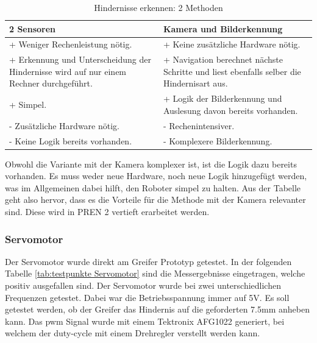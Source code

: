\begin{table}[H]
\centering
\small
\begin{tabularx}{\textwidth}{|X|X|}
        \hline
        \textbf{2 Sensoren} & \textbf{Kamera und Bilderkennung}\\
        \hline
        + Weniger Rechenleistung nötig. & + Keine zusätzliche Hardware nötig.  \\ \hline
        + Erkennung und Unterscheidung der Hindernisse wird auf nur einem Rechner durchgeführt.  & + Navigation berechnet nächste Schritte und liest ebenfalls selber die Hindernisart aus.  \\ \hline
        + Simpel. & + Logik der Bilderkennung und Auslesung davon bereits vorhanden. \\ \hline 
        - Zusätzliche Hardware nötig. & - Rechenintensiver.\\ \hline
        - Keine Logik bereits vorhanden. & - Komplexere Bilderkennung.  \\ \hline

\end{tabularx}
    \caption{Hindernisse erkennen: 2 Methoden}
\label{tab:obstacle-sensor}
\end{table}

Obwohl die Variante mit der Kamera komplexer ist, ist die Logik dazu bereits vorhanden. Es muss weder neue Hardware, noch neue Logik hinzugefügt werden, was im Allgemeinen dabei hilft, den Roboter simpel zu halten. Aus der Tabelle geht also hervor, dass es die Vorteile für die Methode mit der Kamera relevanter sind. Diese wird in PREN 2 vertieft erarbeitet werden.

\subsubsection*{Servomotor}


Der Servomotor wurde direkt am Greifer Prototyp getestet. In der folgenden Tabelle \ref{tab:testpunkte Servomotor} sind die Messergebnisse eingetragen, welche positiv ausgefallen sind. Der Servomotor wurde bei zwei unterschiedlichen Frequenzen getestet. Dabei war die Betriebsspannung immer auf 5V. Es soll getestet werden, ob der Greifer das Hindernis auf die geforderten 7.5mm anheben kann. Das \acrshort{pwm} Signal wurde mit einem Tektronix AFG1022 generiert, bei welchem der \gls{duty-cycle} mit einem Drehregler verstellt werden kann.

